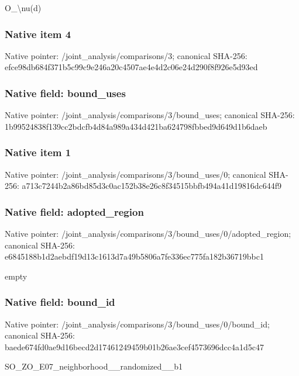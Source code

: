 \documentclass[10pt,a4paper]{article}
\begin{document}
\begingroup\raggedright\sloppy O\_\allowbreak{}\textbackslash{}nu(d)\par\endgroup

\subsubsection{Native item 4}
Native pointer: /joint\_\allowbreak{}analysis/comparisons/3; canonical SHA-256: efce98db684f371b5c99c9e246a20c4507ae4e4d2c06e24d290f8f926e5d93ed

\subsubsection{Native field: bound\_\allowbreak{}uses}
Native pointer: /joint\_\allowbreak{}analysis/comparisons/3/bound\_\allowbreak{}uses; canonical SHA-256: 1b99524838f139cc2bdcfb4d84a989a434d421ba624798fbbed9d649d1b6daeb

\subsubsection{Native item 1}
Native pointer: /joint\_\allowbreak{}analysis/comparisons/3/bound\_\allowbreak{}uses/0; canonical SHA-256: a713c7244b2a86bd85d3c0ac152b38e26c8f34515bbfb494a41d19816dc644f9

\subsubsection{Native field: adopted\_\allowbreak{}region}
Native pointer: /joint\_\allowbreak{}analysis/comparisons/3/bound\_\allowbreak{}uses/0/adopted\_\allowbreak{}region; canonical SHA-256: e6845188b1d2aebdf19d13c1613d7a49b5806a7fe336ec775fa182b36719bbc1

\begingroup\raggedright\sloppy empty\par\endgroup

\subsubsection{Native field: bound\_\allowbreak{}id}
Native pointer: /joint\_\allowbreak{}analysis/comparisons/3/bound\_\allowbreak{}uses/0/bound\_\allowbreak{}id; canonical SHA-256: baede674fd0ae9d16becd2d17461249459b01b26ae3cef4573696dcc4a1d5c47

\begingroup\raggedright\sloppy SO\_\allowbreak{}ZO\_\allowbreak{}E07\_\allowbreak{}neighborhood\_\allowbreak{}\_\allowbreak{}randomized\_\allowbreak{}\_\allowbreak{}b1\par\endgroup
\end{document}

